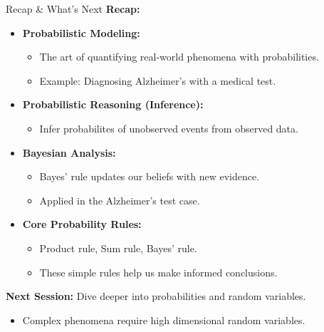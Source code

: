 \documentclass{beamer}
\begin{document}
\begin{frame}{Recap \& What's Next}
  \textbf{Recap:}
  \begin{itemize}
    \item \textbf{Probabilistic Modeling:}
    \begin{itemize}
      \item The art of quantifying real-world phenomena with probabilities.
      \item Example: Diagnosing Alzheimer’s with a medical test.
    \end{itemize}

    \item \textbf{Probabilistic Reasoning (Inference):}
    \begin{itemize}
    \item Infer probabilites of unobserved events from observed data.
    \end{itemize}

    \item \textbf{Bayesian Analysis:}
      \begin{itemize}
      \item Bayes' rule updates our beliefs with new evidence.
      \item Applied in the Alzheimer’s test case.
    \end{itemize}

    \item \textbf{Core Probability Rules:}
    \begin{itemize}
      \item Product rule, Sum rule, Bayes' rule.
      \item These simple rules help us make informed conclusions.
    \end{itemize}
  \end{itemize}

  \vspace{1em}

  \textbf{Next Session:} Dive deeper into probabilities and random variables.
  \begin{itemize}
  \item Complex phenomena require high dimensional random variables.
  \end{itemize}

\end{frame}
\end{document}

